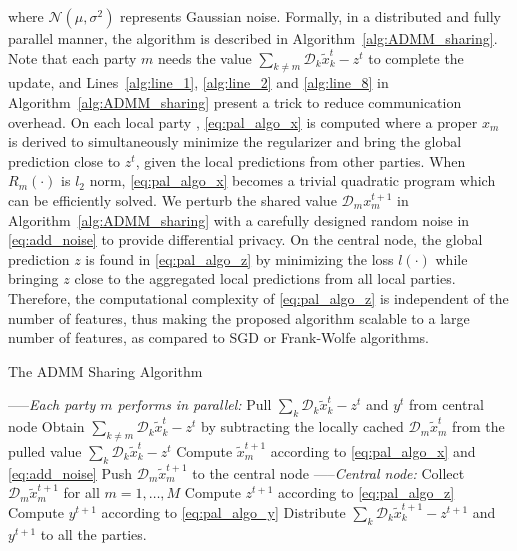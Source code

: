 where $\mathcal{N}(\mu, \sigma^2)$ represents Gaussian noise. Formally, in a distributed and fully parallel manner, the algorithm is described in Algorithm~\ref{alg:ADMM_sharing}. Note that each party $m$ needs the value $\sum_{k\neq m}\mathcal{D}_k\tilde{x}_k^{t} - z^{t}$ to complete the update, and Lines~\ref{alg:line_1}, \ref{alg:line_2} and \ref{alg:line_8} in Algorithm~\ref{alg:ADMM_sharing} present a trick to reduce communication overhead. On each local party , \eqref{eq:pal_algo_x} is computed where a proper $x_m$ is derived to simultaneously minimize the regularizer and bring the global prediction close to $z^t$, given the local predictions from other parties. When $R_m(\cdot)$ is $l_2$ norm, \eqref{eq:pal_algo_x} becomes a trivial quadratic program which can be efficiently solved. We perturb the shared value $\mathcal{D}_mx^{t+1}_m$ in Algorithm~\ref{alg:ADMM_sharing} with a carefully designed random noise in \ref{eq:add_noise} to provide differential privacy. On the central node, the global prediction $z$ is found in \eqref{eq:pal_algo_z} by minimizing the loss $l(\cdot)$ while bringing $z$ close to the aggregated local predictions from all local parties. Therefore, the computational complexity of \eqref{eq:pal_algo_z} is independent of the number of features, thus making the proposed algorithm scalable to a large number of features, as compared to SGD or Frank-Wolfe algorithms. 

\begin{algorithm}[t]
\caption{The ADMM Sharing Algorithm}
\begin{algorithmic}[1]
    \STATE -----\emph{Each party $m$ performs in parallel:}
        \STATE Pull  $\sum_k\mathcal{D}_k\tilde{x}_k^{t} - z^{t}$  and $y^{t}$ from central node \label{alg:line_1}
        \STATE Obtain $\sum_{k\neq m}\mathcal{D}_k\tilde{x}_k^{t} - z^{t}$ by subtracting the locally cached $\mathcal{D}_m\tilde{x}_m^{t}$ from  the pulled value $\sum_k\mathcal{D}_k
        \tilde{x}_k^{t} - z^{t}$ \label{alg:line_2}
        \STATE Compute $\tilde{x}_m^{t+1}$ according to \eqref{eq:pal_algo_x} and \eqref{eq:add_noise} \label{alg:line_3}
        \STATE Push $\mathcal{D}_m\tilde{x}_m^{t+1}$ to the central node \label{alg:line_4}
    \ENDFOR
    \STATE -----\emph{Central node:}
        \STATE Collect $\mathcal{D}_m\tilde{x}_m^{t+1}$ for all $m=1,\ldots,M$\label{alg:line_5}
        \STATE Compute $z^{t+1}$ according to \eqref{eq:pal_algo_z}\label{alg:line_6}
        \STATE Compute $y^{t+1}$ according to \eqref{eq:pal_algo_y}\label{alg:line_7}
        \STATE Distribute $\sum_k\mathcal{D}_k\tilde{x}_k^{t+1} - z^{t+1}$  and $y^{t+1}$ to all the parties. \label{alg:line_8}
    \ENDFOR
\end{algorithmic}
\label{alg:ADMM_sharing}
\end{algorithm}


